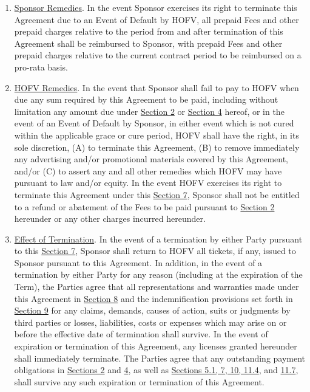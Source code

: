 \documentclass{article}
\begin{document}
\begin{enumerate}
  \begin{enumerate}
  \def\labelenumii{\alph{enumii}.}
  \item
    \uline{Sponsor Remedies}. In the event Sponsor exercises its right
    to terminate this Agreement due to an Event of Default by HOFV, all
    prepaid Fees and other prepaid charges relative to the period from
    and after termination of this Agreement shall be reimbursed to
    Sponsor, with prepaid Fees and other prepaid charges relative to the
    current contract period to be reimbursed on a pro-rata basis.
  \item
    \uline{HOFV Remedies}. In the event that Sponsor shall fail to pay
    to HOFV when due any sum required by this Agreement to be paid,
    including without limitation any amount due under \uline{Section 2}
    or \uline{Section 4} hereof, or in the event of an Event of Default
    by Sponsor, in either event which is not cured within the applicable
    grace or cure period, HOFV shall have the right, in its sole
    discretion, (A) to terminate this Agreement, (B) to remove
    immediately any advertising and/or promotional materials covered by
    this Agreement, and/or (C) to assert any and all other remedies
    which HOFV may have pursuant to law and/or equity. In the event HOFV
    exercises its right to terminate this Agreement under this
    \uline{Section 7}, Sponsor shall not be entitled to a refund or
    abatement of the Fees to be paid pursuant to \uline{Section 2}
    hereunder or any other charges incurred hereunder.
  \item
    \uline{Effect of Termination}. In the event of a termination by
    either Party pursuant to this \uline{Section 7}, Sponsor shall
    return to HOFV all tickets, if any, issued to Sponsor pursuant to
    this Agreement. In addition, in the event of a termination by either
    Party for any reason (including at the expiration of the Term), the
    Parties agree that all representations and warranties made under
    this Agreement in \uline{Section 8} and the indemnification
    provisions set forth in \uline{Section 9} for any claims, demands,
    causes of action, suits or judgments by third parties or losses,
    liabilities, costs or expenses which may arise on or before the
    effective date of termination shall survive. In the event of
    expiration or termination of this Agreement, any licenses granted
    hereunder shall immediately terminate. The Parties agree that any
    outstanding payment obligations in \uline{Sections 2} and \uline{4},
    as well as \uline{Sections 5.1, 7, 10, 11.4}, and \uline{11.7},
    shall survive any such expiration or termination of this Agreement.
  \end{enumerate}
\end{enumerate}
\end{document}
